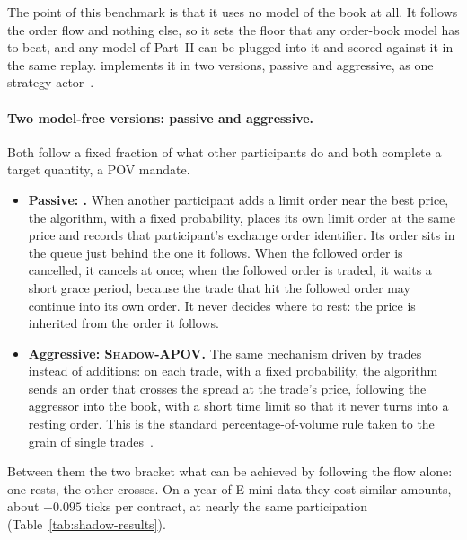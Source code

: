 The point of this benchmark is that it uses no model of the book at all. It follows the order flow and nothing else,
so it sets the floor that any order-book model has to beat, and any model of Part~II can be plugged into it and scored
against it in the same replay. \kasparhft{} implements it in two versions, passive and aggressive, as one strategy
actor~\citep{maciejewski_shadow}.

\paragraph{Two model-free versions: passive and aggressive.} Both follow a fixed fraction of what other participants do
and both complete a target quantity, a POV mandate.
\begin{itemize}[leftmargin=1.5em,itemsep=2pt]
\item \textbf{Passive: \pov{}.} When another participant adds a limit order near the best price, the algorithm, with a
  fixed probability, places its own limit order at the same price and records that participant's exchange order
  identifier. Its order sits in the queue just behind the one it follows. When the followed order is cancelled, it
  cancels at once; when the followed order is traded, it waits a short grace period, because the trade that hit the
  followed order may continue into its own order. It never decides where to rest: the price is inherited from the
  order it follows.
\item \textbf{Aggressive: \textsc{Shadow-APOV}.} The same mechanism driven by trades instead of additions: on each trade, with a
  fixed probability, the algorithm sends an order that crosses the spread at the trade's price, following the aggressor
  into the book, with a short time limit so that it never turns into a resting order. This is the standard
  percentage-of-volume rule taken to the grain of single trades~\citep{maciejewski_shadow}.
\end{itemize}
Between them the two bracket what can be achieved by following the flow alone: one rests, the other crosses. On a
year of E-mini data they cost similar amounts, about $+0.095$ ticks per contract, at nearly the same participation
(Table~\ref{tab:shadow-results}).

